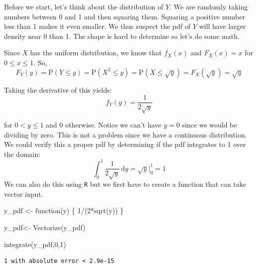 \documentclass[
  letterpaper,
  DIV=11,
  numbers=noendperiod]{scrreprt}
\newenvironment{Shaded}{\begin{snugshade}}{\end{snugshade}}
\newcommand{\ControlFlowTok}[1]{\textcolor[rgb]{0.00,0.23,0.31}{#1}}
\newcommand{\DecValTok}[1]{\textcolor[rgb]{0.68,0.00,0.00}{#1}}
\newcommand{\FunctionTok}[1]{\textcolor[rgb]{0.28,0.35,0.67}{#1}}
\newcommand{\NormalTok}[1]{\textcolor[rgb]{0.00,0.23,0.31}{#1}}
\newcommand{\OtherTok}[1]{\textcolor[rgb]{0.00,0.23,0.31}{#1}}
\newcommand{\SpecialCharTok}[1]{\textcolor[rgb]{0.37,0.37,0.37}{#1}}
\begin{document}
Before we start, let's think about the distribution of \(Y\). We are
randomly taking numbers between 0 and 1 and then squaring them. Squaring
a positive number less than 1 makes it even smaller. We thus suspect the
pdf of \(Y\) will have larger density near 0 than 1. The shape is hard
to determine so let's do some math.

Since \(X\) has the uniform distribution, we know that \(f_X(x)\) and
\(F_X(x)=x\) for \(0\leq x \leq 1\). So, \[
F_Y(y)=\mbox{P}(Y\leq y)=\mbox{P}(X^2\leq y)=\mbox{P}(X\leq \sqrt{y})=F_X\left(\sqrt{y}\right)=\sqrt{y}
\]

Taking the derivative of this yields: \[
f_Y(y)=\frac{1}{2\sqrt{y}}
\]

for \(0 < y \leq 1\) and 0 otherwise. Notice we can't have \(y=0\) since
we would be dividing by zero. This is not a problem since we have a
continuous distribution. We could verify this a proper pdf by
determining if the pdf integrates to 1 over the domain: \[
\int_0^1 \frac{1}{2\sqrt{y}} \,\mathrm{d}y = \sqrt{y}\bigg|_0^1 = 1
\] We can also do this using \texttt{R} but we first have to create a
function that can take vector input.

\begin{Shaded}
\begin{Highlighting}[]
\NormalTok{y\_pdf }\OtherTok{\textless{}{-}} \ControlFlowTok{function}\NormalTok{(y) \{}
  \DecValTok{1}\SpecialCharTok{/}\NormalTok{(}\DecValTok{2}\SpecialCharTok{*}\FunctionTok{sqrt}\NormalTok{(y))}
\NormalTok{\}}
\end{Highlighting}
\end{Shaded}

\begin{Shaded}
\begin{Highlighting}[]
\NormalTok{y\_pdf}\OtherTok{\textless{}{-}} \FunctionTok{Vectorize}\NormalTok{(y\_pdf)}
\end{Highlighting}
\end{Shaded}

\begin{Shaded}
\begin{Highlighting}[]
\FunctionTok{integrate}\NormalTok{(y\_pdf,}\DecValTok{0}\NormalTok{,}\DecValTok{1}\NormalTok{)}
\end{Highlighting}
\end{Shaded}

\begin{verbatim}
1 with absolute error < 2.9e-15
\end{verbatim}
\end{document}
